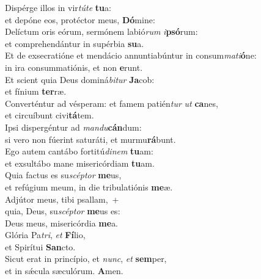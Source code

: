\evenverse Dispérge illos in vir\textit{tú}\textit{te} \textbf{tu}a:~\*\\
\evenverse et depóne eos, protéctor meus, \textbf{Dó}mine:\\
\oddverse Delíctum oris eórum, sermónem labió\textit{rum} \textit{i}\textbf{psó}rum:~\*\\
\oddverse et comprehendántur in supérbia \textbf{su}a.\\
\evenverse Et de exsecratióne et mendácio annuntiabúntur in consum\textit{ma}\textit{ti}\textbf{ó}ne:~\*\\
\evenverse in ira consummatiónis, et non \textbf{e}runt.\\
\oddverse Et scient quia Deus dominá\textit{bi}\textit{tur} \textbf{Ja}cob:~\*\\
\oddverse et fínium \textbf{ter}ræ.\\
\evenverse Converténtur ad vésperam: et famem patién\textit{tur} \textit{ut} \textbf{ca}nes,~\*\\
\evenverse et circuíbunt civi\textbf{tá}tem.\\
\oddverse Ipsi dispergéntur ad \textit{man}\textit{du}\textbf{cán}dum:~\*\\
\oddverse si vero non fúerint saturáti, et murmu\textbf{rá}bunt.\\
\evenverse Ego autem cantábo fortitú\textit{di}\textit{nem} \textbf{tu}am:~\*\\
\evenverse et exsultábo mane misericórdiam \textbf{tu}am.\\
\oddverse Quia factus es su\textit{scép}\textit{tor} \textbf{me}us,~\*\\
\oddverse et refúgium meum, in die tribulatiónis \textbf{me}æ.\\
\evenverse Adjútor meus, tibi psallam,~+\\
\evenverse  quia, Deus, su\textit{scép}\textit{tor} \textbf{me}us es:~\*\\
\evenverse Deus meus, misericórdia \textbf{me}a.\\
\oddverse Glória Pa\textit{tri}, \textit{et} \textbf{Fí}lio,~\*\\
\oddverse et Spirítui \textbf{San}cto.\\
\evenverse Sicut erat in princípio, et \textit{nunc}, \textit{et} \textbf{sem}per,~\*\\
\evenverse et in sǽcula sæculórum. \textbf{A}men.\\
